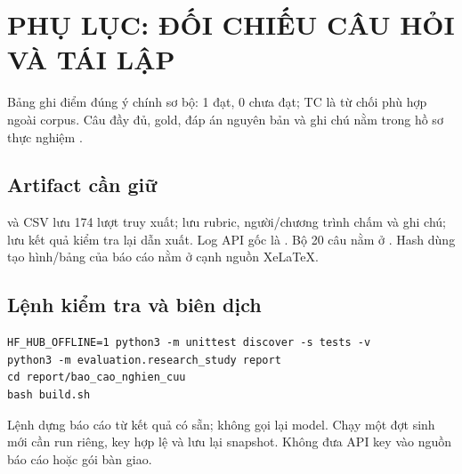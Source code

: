 \section*{PHỤ LỤC: ĐỐI CHIẾU CÂU HỎI VÀ TÁI LẬP}
\noindent Bảng ghi điểm đúng ý chính sơ bộ: 1 đạt, 0 chưa đạt; TC là từ chối phù hợp ngoài corpus. Câu đầy đủ, gold, đáp án nguyên bản và ghi chú nằm trong hồ sơ thực nghiệm \cite{artifacts}.
\begin{table}[H]
\centering\small{}\renewcommand{\arraystretch}{1.12}

\end{table}

\subsection*{Artifact cần giữ}
\noindent\small
{} và CSV lưu 174 lượt truy xuất;  lưu rubric, người/chương trình chấm và ghi chú;  lưu kết quả kiểm tra lại dẫn xuất. Log API gốc là . Bộ 20 câu nằm ở . Hash dùng tạo hình/bảng của báo cáo nằm ở  cạnh nguồn XeLaTeX.

\subsection*{Lệnh kiểm tra và biên dịch}
\noindent\small{}
\begin{verbatim}
HF_HUB_OFFLINE=1 python3 -m unittest discover -s tests -v
python3 -m evaluation.research_study report
cd report/bao_cao_nghien_cuu
bash build.sh
\end{verbatim}
\noindent Lệnh  dựng báo cáo từ kết quả có sẵn; không gọi lại model. Chạy một đợt sinh mới cần run riêng, key hợp lệ và lưu lại snapshot. Không đưa API key vào nguồn báo cáo hoặc gói bàn giao.
